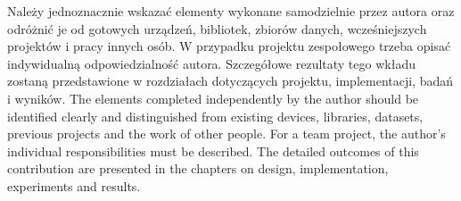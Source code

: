 \ploren
  {Należy jednoznacznie wskazać elementy wykonane samodzielnie przez autora oraz odróżnić je od gotowych urządzeń, bibliotek, zbiorów danych, wcześniejszych projektów i pracy innych osób. W przypadku projektu zespołowego trzeba opisać indywidualną odpowiedzialność autora. Szczegółowe rezultaty tego wkładu zostaną przedstawione w rozdziałach dotyczących projektu, implementacji, badań i wyników.}
  {The elements completed independently by the author should be identified clearly and distinguished from existing devices, libraries, datasets, previous projects and the work of other people. For a team project, the author's individual responsibilities must be described. The detailed outcomes of this contribution are presented in the chapters on design, implementation, experiments and results.}
